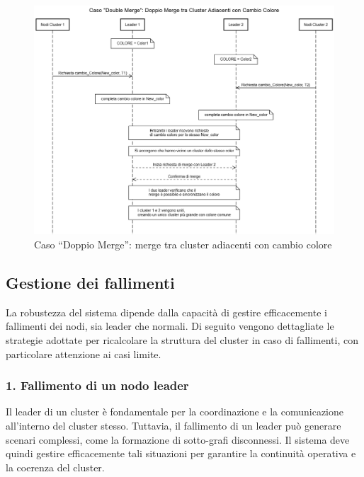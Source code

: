 \documentclass[12pt, a4paper]{report}
\begin{document}
\begin{figure}[H]
    \centering
    \includegraphics[width=1\textwidth,align=t]{images/concorrenza/doubleMerge.png}
    \caption{Caso ``Doppio Merge'': merge tra cluster adiacenti con cambio colore}
    \label{fig:double_merge}
\end{figure}

\subsection{Gestione dei fallimenti}\label{subsec:gestione_fallimenti}

La robustezza del sistema dipende dalla capacit\`a di gestire efficacemente i fallimenti dei nodi, sia leader che normali. Di seguito vengono dettagliate le strategie adottate per ricalcolare la struttura del cluster in caso di fallimenti, con particolare attenzione ai casi limite.

\subsubsection{1. Fallimento di un nodo leader}
\label{subsubsec:fallimento_leader}
Il leader di un cluster \`e fondamentale per la coordinazione e la comunicazione all'interno del cluster stesso. Tuttavia, il fallimento di un leader pu\`o generare scenari complessi, come la formazione di sotto-grafi disconnessi. Il sistema deve quindi gestire efficacemente tali situazioni per garantire la continuit\`a operativa e la coerenza del cluster.
\end{document}
